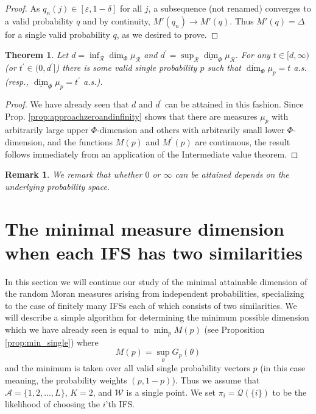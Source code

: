 \documentclass{amsart}
\newtheorem{theorem}{Theorem}
\theoremstyle{plain}
\newtheorem{remark}{Remark}
\numberwithin{equation}{section}
\newcommand{\cR}{{\mathcal R}}
\newcommand{\cQ}{{\mathcal Q}}
\newcommand{\cA}{{\mathcal A}}
\newcommand{\cW}{{\mathcal W}}
\newcommand{\odim}{\overline{\dim}}
\newcommand{\udim}{\underline{\dim}}
\begin{document}
\begin{proof}
As $q_{n}(j)\in [\varepsilon ,1-\delta]$ for all $j$, a subsequence
(not renamed) converges to a valid probability $q$ and by continuity, 
$M'(q_n) \to M'(q)$. 
Thus  $M'(q)=\Delta$ for a single valid probability $q$, as we desired to prove.
\end{proof}


\begin{theorem} 
\label{thm:singlefull}
Let $d=\inf_\cR \odim_\Phi \mu _\cR $ and 
$d^{\prime }=\sup_\cR \udim_\Phi \mu _\cR$. 
For any $t\in \lbrack d,\infty )$ (or $t^{\prime }\in (0,d^{\prime }]$) there is some valid single probability $p$ such that $\odim_{\Phi }\mu _{p}=t$ a.s. (resp., 
$\udim_{\Phi }\mu_{p}=t^{\prime }$ a.s.).
\end{theorem}

\begin{proof}
We have already seen that $d$ and $d^{\prime }$ can be attained in this fashion. 
Since Prop. \ref{prop:approachzeroandinfinity} shows that there are measures 
$\mu _{p}$ with arbitrarily large upper $\Phi $-dimension and others with 
arbitrarily small lower $\Phi $-dimension, and the functions $M(p)$ and $M^{\prime }(p)$ are continuous, the result follows immediately
from an application of the Intermediate value theorem.
\end{proof}

\begin{remark}
We remark that whether $0$ or $\infty $ can be attained depends on the
underlying probability space.
\end{remark}

\section{The minimal measure dimension when each IFS has two similarities}
\label{sec:algorithm}

In this section we will continue our study of the minimal attainable
dimension of the random Moran measures arising from independent
probabilities, specializing to the case of finitely many IFSs
each of which consists of two similarities. 
We will describe a simple algorithm for determining the minimum possible dimension which we have already seen is
equal to $\min_{p}M(p)$ (see Proposition \ref{prop:min_single}) where 
\begin{equation*}
    M(p)=\sup_{\theta }G_{p}(\theta )
\end{equation*}
and the minimum is taken over all valid single probability vectors $p$ (in this case meaning,
the probability weights $(p,1-p)$).
Thus we assume that $\cA = \{ 1, 2, \ldots, L \}$, $K = 2$, and $\cW$ is a single point.
We set $\pi_i = \cQ(\{ i \})$ to be the likelihood of choosing the $i$'th IFS. 
\end{document}
